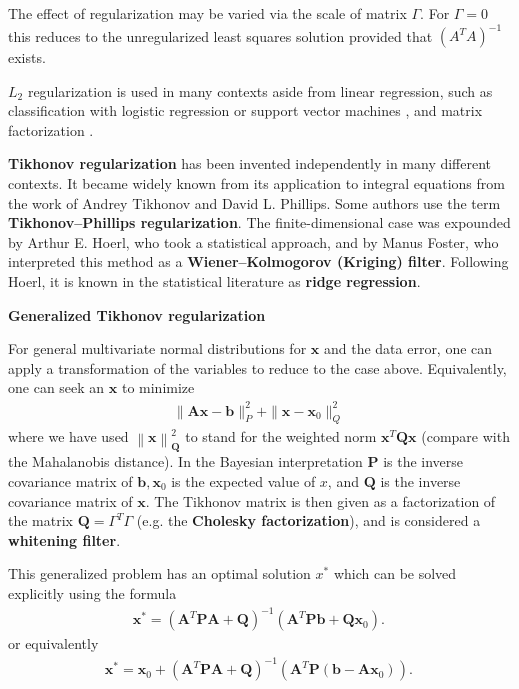 The effect of regularization may be varied via the scale of matrix $\Gamma$. For $ \Gamma =0$ this reduces to the unregularized least squares solution provided that $(A^TA)^{-1}$ exists.

$L_2$ regularization is used in many contexts aside from linear regression, such as classification with logistic regression or support vector machines \cite{Fan2008LIBLINEAR}, and matrix factorization \cite{Guan2012Online}.

\textbf{Tikhonov regularization} has been invented independently in many different contexts. It became widely known from its application to integral equations from the work of Andrey Tikhonov and David L. Phillips. Some authors use the term \textbf{Tikhonov–Phillips regularization}. The finite-dimensional case was expounded by Arthur E. Hoerl, who took a statistical approach, and by Manus Foster, who interpreted this method as a \textbf{Wiener–Kolmogorov (Kriging) filter}. Following Hoerl, it is known in the statistical literature as \textbf{ridge regression}.

\textbf{Generalized Tikhonov regularization}

For general multivariate normal distributions for $\bm x$ and the data error, one can apply a transformation of the variables to reduce to the case above. Equivalently, one can seek an $\bm x$ to minimize
\begin{align}
  \|\bm A\bm x-\bm b\|_{P}^{2}+\|\bm x-\bm x_{0}\|_{Q}^{2}\,
\end{align}
where we have used $\left\|\bm x\right\|_{\bm Q}^{2}$ to stand for the weighted norm $ \bm x^{T}\bm Q\bm x$ (compare with the Mahalanobis distance). In the Bayesian interpretation $\bm P$ is the inverse covariance matrix of $\bm b, \bm x_0$ is the expected value of $x$, and $\bm Q$ is the inverse covariance matrix of $\bm x$. The Tikhonov matrix is then given as a factorization of the matrix $\displaystyle \bm Q=\Gamma ^{T}\Gamma$ (e.g. the \textbf{Cholesky factorization}), and is considered a \textbf{whitening filter}.

This generalized problem has an optimal solution $x^{*}$ which can be solved explicitly using the formula
\begin{align}
  \bm x^{*}=(\bm A^{T}\bm P\bm A+\bm Q)^{-1}(\bm A^{T}\bm P\bm b+\bm Q\bm x_{0}).\,
\end{align}
or equivalently
\begin{align}
  \bm x^{*}=\bm x_{0}+(\bm A^{T}\bm P\bm A+\bm Q)^{-1}(\bm A^{T}\bm P(\bm b-\bm A \bm x_{0})).\,
\end{align}
